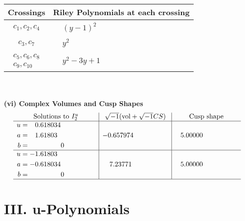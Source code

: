 \documentclass[1p]{elsarticle_modified}
\theoremstyle{definition}
\newcommand{\I}{\sqrt{-1}}
\begin{document}
\begin{tabular}{m{50pt}|m{274pt}}
Crossings & \hspace{64pt}Riley Polynomials at each crossing \\
\hline $$\begin{aligned}c_{1},c_{2},c_{4}\end{aligned}$$&$\begin{aligned}
&(y-1)^2
\end{aligned}$\\
\hline $$\begin{aligned}c_{3},c_{7}\end{aligned}$$&$\begin{aligned}
&y^2
\end{aligned}$\\
\hline $$\begin{aligned}c_{5},c_{6},c_{8}\\c_{9},c_{10}\end{aligned}$$&$\begin{aligned}
&y^2-3 y+1
\end{aligned}$\\
\hline
\end{tabular}\\~\\
\newpage\flushleft \textbf{(vi) Complex Volumes and Cusp Shapes}
$$\begin{array}{c|c|c}  
\text{Solutions to }I^u_{2}& \I (\text{vol} + \sqrt{-1}CS) & \text{Cusp shape}\\
 \hline 
\begin{aligned}
u &= \phantom{-}0.618034\phantom{ +0.000000I} \\
a &= \phantom{-}1.61803\phantom{ +0.000000I} \\
b &= \phantom{-0.000000 } 0\end{aligned}
 & -0.657974\phantom{ +0.000000I} & \phantom{-}5.00000\phantom{ +0.000000I} \\ \hline\begin{aligned}
u &= -1.61803\phantom{ +0.000000I} \\
a &= -0.618034\phantom{ +0.000000I} \\
b &= \phantom{-0.000000 } 0\end{aligned}
 & \phantom{-}7.23771\phantom{ +0.000000I} & \phantom{-}5.00000\phantom{ +0.000000I}\\
 \hline 
 \end{array}$$\newpage
\newpage\renewcommand{\arraystretch}{1}
\centering \section*{ III. u-Polynomials}
\end{document}
